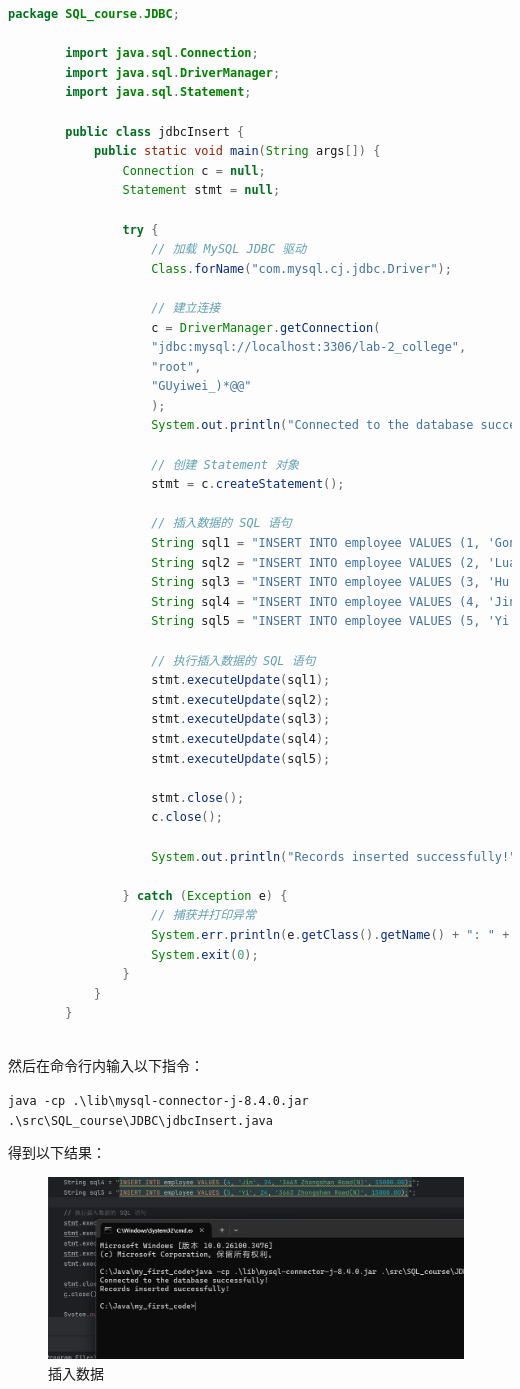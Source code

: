 \documentclass{article}
\begin{document}
	\begin{lstlisting}[language=java, title=jdbcInsert, tabsize=4]
		package SQL_course.JDBC;
		
		import java.sql.Connection;
		import java.sql.DriverManager;
		import java.sql.Statement;
		
		public class jdbcInsert {
			public static void main(String args[]) {
				Connection c = null;
				Statement stmt = null;
				
				try {
					// 加载 MySQL JDBC 驱动
					Class.forName("com.mysql.cj.jdbc.Driver");
					
					// 建立连接
					c = DriverManager.getConnection(
					"jdbc:mysql://localhost:3306/lab-2_college",
					"root",
					"GUyiwei_)*@@"
					);
					System.out.println("Connected to the database successfully!");
					
					// 创建 Statement 对象
					stmt = c.createStatement();
					
					// 插入数据的 SQL 语句
					String sql1 = "INSERT INTO employee VALUES (1, 'Gong', 48, '2075 Kongjiang Road', 20000.00);";
					String sql2 = "INSERT INTO employee VALUES (2, 'Luan', 25, '3663 Zhongshan Road(N)', 15000.00);";
					String sql3 = "INSERT INTO employee VALUES (3, 'Hu', 23, '3663 Zhongshan Road(N)', 15000.00);";
					String sql4 = "INSERT INTO employee VALUES (4, 'Jin', 24, '3663 Zhongshan Road(N)', 15000.00);";
					String sql5 = "INSERT INTO employee VALUES (5, 'Yi', 24, '3663 Zhongshan Road(N)', 15000.00);";
					
					// 执行插入数据的 SQL 语句
					stmt.executeUpdate(sql1);
					stmt.executeUpdate(sql2);
					stmt.executeUpdate(sql3);
					stmt.executeUpdate(sql4);
					stmt.executeUpdate(sql5);
					
					stmt.close();
					c.close();
					
					System.out.println("Records inserted successfully!");
					
				} catch (Exception e) {
					// 捕获并打印异常
					System.err.println(e.getClass().getName() + ": " + e.getMessage());
					System.exit(0);
				}
			}
		}
		
	\end{lstlisting}
	
	然后在命令行内输入以下指令：
	
	\verb|java -cp .\lib\mysql-connector-j-8.4.0.jar .\src\SQL_course\JDBC\jdbcInsert.java|
	
	得到以下结果：
	
	\begin{figure}[H]
		\centering
		\includegraphics[width=11cm]{./images/8.插入数据.png}
		\caption{插入数据}
	\end{figure}
	
\end{document}

